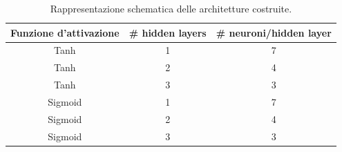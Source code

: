 \documentclass[12pt,a4paper,final]{book}
\begin{document}
\begin{table}
	\centering
	\begin{tabular}{||c | c | c||}
	\hline
	Funzione d'attivazione & \# hidden layers & \# neuroni/hidden layer \\
	\hline\hline
	Tanh & 1 & 7 \\
	\hline
	Tanh & 2 & 4 \\
	\hline
	Tanh & 3 & 3 \\
	\hline
	Sigmoid & 1 & 7 \\
	\hline
	Sigmoid & 2 & 4 \\
	\hline
	Sigmoid & 3 & 3 \\
	\hline
	\end{tabular}
	\caption{Rappresentazione schematica delle architetture costruite.}
	\label{architetture}
\end{table}
\end{document}
